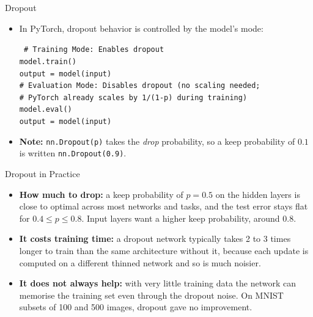 \begin{frame}{Dropout}
    \begin{itemize}
        \item In PyTorch, dropout behavior is controlled by the model's mode:
            \begin{block}{}
        \texttt{\small
        \# Training Mode: Enables dropout\\
        model.train() \\
        output = model(input) \\[1em]
        \# Evaluation Mode: Disables dropout (no scaling needed;\\
        \# PyTorch already scales by 1/(1-p) during training)\\
        model.eval() \\
        output = model(input)
        }
    \end{block}
        \item \textbf{Note:} \texttt{nn.Dropout(p)} takes the \textit{drop} probability, so a keep probability of $0.1$ is written \texttt{nn.Dropout(0.9)}.
    \end{itemize}
\end{frame}

\begin{frame}{Dropout in Practice}
    \begin{itemize}
        \item \textbf{How much to drop:} a keep probability of $p = 0.5$ on the hidden layers is close to optimal across most networks and tasks, and the test error stays flat for $0.4 \leq p \leq 0.8$. Input layers want a higher keep probability, around $0.8$.
        \item \textbf{It costs training time:} a dropout network typically takes 2 to 3 times longer to train than the same architecture without it, because each update is computed on a different thinned network and so is much noisier.
        \item \textbf{It does not always help:} with very little training data the network can memorise the training set even through the dropout noise. On MNIST subsets of 100 and 500 images, dropout gave no improvement.
    \end{itemize}
\end{frame} 